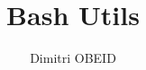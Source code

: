 \documentclass[a4paper,10pt]{article}
\title{\color{sec1}Bash Utils}\color{text}
\author{Dimitri OBEID}
\begin{document}
    \maketitle
    \newpage

    \hypertarget{contents}{}
    \tableofcontents
    \newpage

    \begin{abstract}

    \end{abstract}

    \section{}




\end{document}

